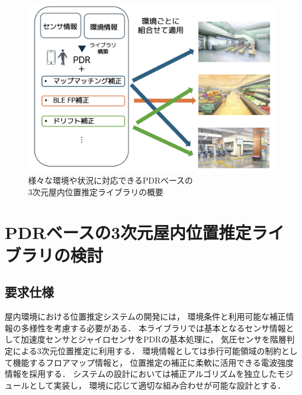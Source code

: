 \documentclass[a4paper, 10pt, twocolumn]{jarticle}
\begin{document}
\begin{figure}[h]
	\centering
	\includegraphics[width=\linewidth]{image/first.png}
	\caption{様々な環境や状況に対応できるPDRベースの\\3次元屋内位置推定ライブラリの概要}    \label{fig:overview}
\end{figure}


\section{PDRベースの3次元屋内位置推定ライブラリの検討}


\subsection{要求仕様}



屋内環境における位置推定システムの開発には，
環境条件と利用可能な補正情報の多様性を考慮する必要がある．
本ライブラリでは基本となるセンサ情報として加速度センサとジャイロセンサをPDRの基本処理に，
気圧センサを階層判定による3次元位置推定に利用する．
環境情報としては歩行可能領域の制約として機能するフロアマップ情報と，
位置推定の補正に柔軟に活用できる電波強度情報を採用する．
システムの設計においては補正アルゴリズムを独立したモジュールとして実装し，
環境に応じて適切な組み合わせが可能な設計とする．
\end{document}
